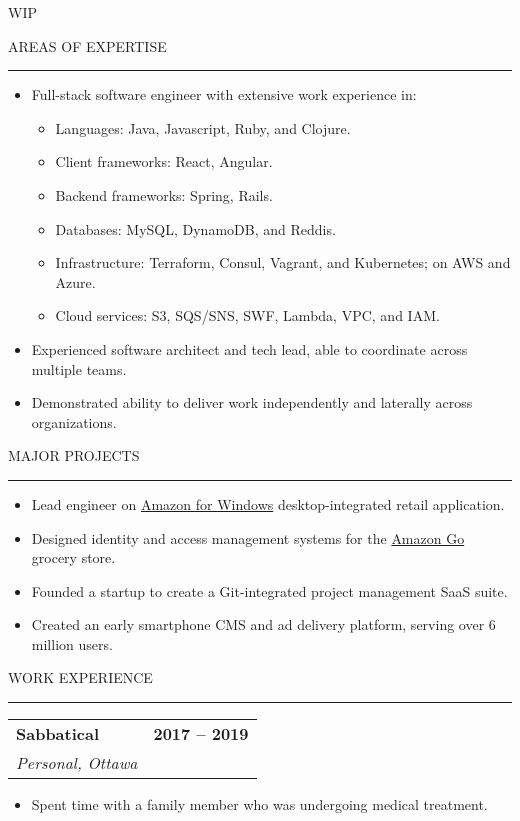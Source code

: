 \documentclass[12pt]{article}
\makeatletter
\newenvironment{justifycolumns}
{\begin{tabular*}{\textwidth}{@{\extracolsep{\fill}}lr@{}}}
{\end{tabular*}}
\newcommand{\row}[2]{#1 & #2 \\}
\newcommand{\rowheading}[2]{\row{\textbf{#1}}{\textbf{#2}}}
\newcommand{\range}[2]{#1 -- #2}
\newcommand{\blockseparation}{\vspace{0.15in}}
\newcommand{\heading}[1]{
	\blockseparation
	\uppercase{#1}
	\vspace{0.05in}
	\hrule
	\blockseparation
}
\newenvironment{tightbullets}
{\begin{itemize}}
{\end{itemize}}
\newenvironment{bullets}
{\begin{tightbullets}}
{\end{tightbullets} \blockseparation}
\makeatother
\begin{document}
\begin{flushleft}
WIP

\pagebreak

\heading{Areas of Expertise}

\begin{bullets}
	\item Full-stack software engineer with extensive work experience in:

	\begin{tightbullets}
		\item Languages: Java, Javascript, Ruby, and Clojure.
		\item Client frameworks: React, Angular.
		\item Backend frameworks: Spring, Rails.
		\item Databases: MySQL, DynamoDB, and Reddis.
		\item Infrastructure: Terraform, Consul, Vagrant, and Kubernetes; on AWS and Azure.
		\item Cloud services: S3, SQS/SNS, SWF, Lambda, VPC, and IAM.
	\end{tightbullets}

	\item Experienced software architect and tech lead, able to coordinate across multiple teams.
	\item Demonstrated ability to deliver work independently and laterally across organizations.
\end{bullets}


\heading{Major Projects}

\begin{bullets}
	\item Lead engineer on \href{http://apps.microsoft.com/windows/en-us/app/amazon/80299018-3dee-418d-8466-374fe9463309}{Amazon for Windows} desktop-integrated retail application.
	\item Designed identity and access management systems for the \href{https://www.amazon.com/b?ie=UTF8\&node=16008589011}{Amazon Go} grocery store.
	\item Founded a startup to create a Git-integrated project management SaaS suite.
	\item Created an early smartphone CMS and ad delivery platform, serving over 6 million users.
\end{bullets}


\heading{Work Experience}

\begin{justifycolumns}
	\rowheading{Sabbatical}{\range{2017}{2019}}
	\row{\emph{Personal, Ottawa}}{}
\end{justifycolumns}
\begin{bullets}
	\item Spent time with a family member who was undergoing medical treatment.
\end{bullets}


\end{flushleft}
\end{document}
